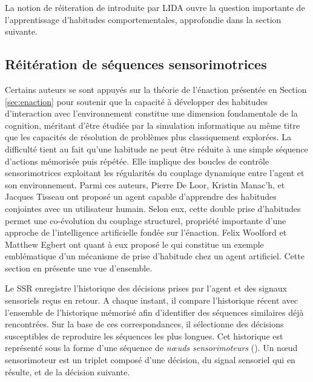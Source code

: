 La notion de réiteration de  introduite par LIDA ouvre la question importante de l'apprentissage d'habitudes comportementales, approfondie dans la section suivante. 

\subsection{Réitération de séquences sensorimotrices}
\label{sec:ssr}

\noindent
Certains auteurs se sont appuyés sur la théorie de l'énaction présentée en Section \ref{sec:enaction} pour soutenir que la capacité à développer des habitudes d'interaction avec l'environnement constitue une dimension fondamentale de la cognition, méritant d’être étudiée par la simulation informatique au même titre que les capacités de résolution de problèmes plus classiquement explorées.
La difficulté tient au fait qu'une habitude ne peut être réduite à une simple séquence d'actions mémorisée puis répétée.
Elle implique des boucles de contrôle sensorimotrices exploitant les régularités du couplage dynamique entre l’agent et son environnement.
Parmi ces auteurs, Pierre De Loor, Kristin Manac'h, et Jacques Tisseau ont proposé un agent capable d'apprendre des habitudes conjointes avec un utilisateur humain.
Selon eux, cette double prise d'habitudes permet une co-évolution du couplage structurel, propriété importante d'une approche de l'intelligence artificielle fondée sur l'énaction. 
Felix Woolford et Matthew Egbert ont quant à eux proposé le  qui constitue un exemple emblématique d'un mécanisme de prise d'habitude chez un agent artificiel. 
Cette section en présente une vue d'ensemble.



Le SSR enregistre l’historique des décisions prises par l'agent et des signaux sensoriels reçus en retour.
A chaque instant, il compare l’historique récent avec l’ensemble de l’historique mémorisé afin d’identifier des séquences similaires déjà rencontrées. 
Sur la base de ces correspondances, il sélectionne des décisions susceptibles de reproduire les séquences les plus longues.
Cet historique est représenté sous la forme d’une séquence de \emph{nœuds sensorimoteurs} (). 
Un nœud sensorimoteur est un triplet composé d’une décision, du signal sensoriel qui en résulte, et de la décision suivante. 


